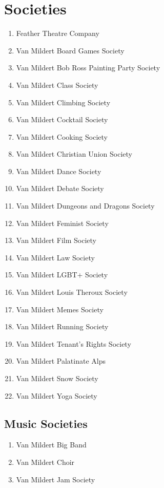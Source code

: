 \documentclass[12pt]{article}  %
\begin{document}
\section{Societies}
\begin{enumerate}[]
    \item Feather Theatre Company
    \item Van Mildert Board Games Society
    \item Van Mildert Bob Ross Painting Party Society
    \item Van Mildert Class Society
    \item Van Mildert Climbing Society
    \item Van Mildert Cocktail Society
    \item Van Mildert Cooking Society
    \item Van Mildert Christian Union Society
    \item Van Mildert Dance Society
    \item Van Mildert Debate Society
    \item Van Mildert Dungeons and Dragons Society
    \item Van Mildert Feminist Society
    \item Van Mildert Film Society
    \item Van Mildert Law Society
    \item Van Mildert LGBT+ Society
    \item Van Mildert Louis Theroux Society
    \item Van Mildert Memes Society
    \item Van Mildert Running Society
    \item Van Mildert Tenant's Rights Society
    \item Van Mildert Palatinate Alps
    \item Van Mildert Snow Society
    \item Van Mildert Yoga Society
\end{enumerate}
\subsection{Music Societies}
\begin{enumerate}[]
    \item Van Mildert Big Band
    \item Van Mildert Choir
    \item Van Mildert Jam Society
\end{enumerate}
\end{document}
